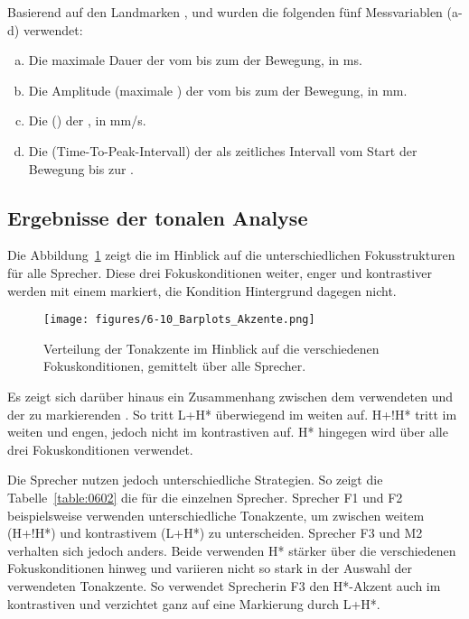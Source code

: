 Basierend auf den Landmarken ,  und  wurden die folgenden fünf Messvariablen (a-d) verwendet:

\begin{enumerate}[(a)]
	\item Die maximale Dauer der  vom  bis zum  der Bewegung, in ms.
	\item Die Amplitude (maximale ) der  vom  bis zum  der Bewegung, in mm.
	\item Die  () der , in mm/s.
	\item Die  (Time-To-Peak-Intervall) der  als zeitliches Intervall vom Start der Bewegung bis zur  \citep{Cho2002a, Cho2006, Byrd1998}.
\end{enumerate}
  

 
\subsection{Ergebnisse der tonalen Analyse}
\label{subsec:060302}

Die Abbildung~\ref{figure:0610} zeigt die  im Hinblick auf die unterschiedlichen Fokusstrukturen für alle Sprecher. Diese drei Fokuskonditionen weiter, enger und kontrastiver  werden mit einem  markiert, die Kondition Hintergrund dagegen nicht.


\begin{figure}
	\texttt{[image: figures/6-10\_Barplots\_Akzente.png]}
	\caption{Verteilung der Tonakzente im Hinblick auf die verschiedenen Fokuskonditionen, gemittelt über alle Sprecher.}
	\label{figure:0610}
\end{figure}


Es zeigt sich darüber hinaus ein Zusammenhang zwischen dem verwendeten  und der zu markierenden  \citep{Mücke2016}. So tritt L+H* überwiegend im weiten  auf. H+!H* tritt im weiten und engen, jedoch nicht im kontrastiven  auf. H* hingegen wird über alle drei Fokuskonditionen verwendet.

Die Sprecher nutzen jedoch unterschiedliche Strategien. So zeigt die Tabelle~\ref{table:0602} die  für die einzelnen Sprecher. Sprecher F1 und F2 beispielsweise verwenden unterschiedliche Tonakzente, um zwischen weitem (H+!H*) und kontrastivem  (L+H*) zu unterscheiden. Sprecher F3 und M2 verhalten sich jedoch anders. Beide verwenden H* stärker über die verschiedenen Fokuskonditionen hinweg und variieren nicht so stark in der Auswahl der verwendeten Tonakzente. So verwendet Sprecherin F3 den H*-Akzent auch im kontrastiven  und verzichtet ganz auf eine Markierung durch L+H*.


